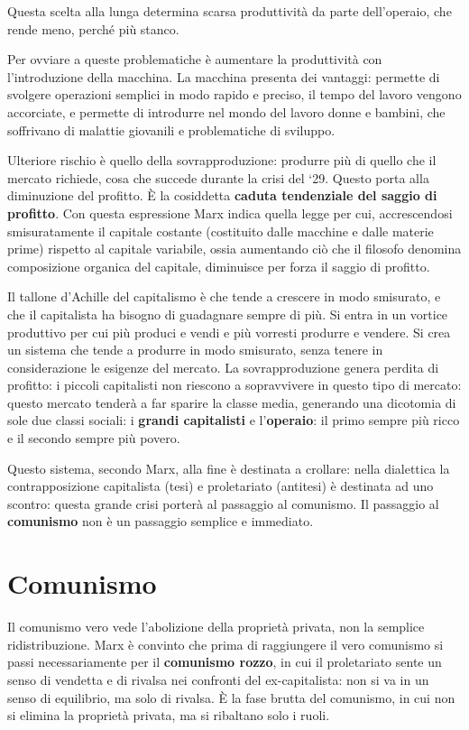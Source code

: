 \documentclass[a4paper, twoside, titlepage]{book}
\begin{document}
Questa scelta alla lunga determina scarsa produttività da parte dell’operaio, che rende meno, perché più stanco.

Per ovviare a queste problematiche è aumentare la produttività con l’introduzione della macchina. La macchina presenta dei vantaggi: permette di svolgere operazioni semplici in modo rapido e preciso, il tempo del lavoro vengono accorciate, e permette di introdurre nel mondo del lavoro donne e bambini, che soffrivano di malattie giovanili e problematiche di sviluppo.

Ulteriore rischio è quello della sovrapproduzione: produrre più di quello che il mercato richiede, cosa che succede durante la crisi del ‘29.
Questo porta alla diminuzione del profitto. È la cosiddetta \textbf{caduta tendenziale del saggio di profitto}. Con questa espressione Marx indica quella legge per cui, accrescendosi smisuratamente il capitale costante (costituito dalle macchine e dalle materie prime) rispetto al capitale variabile, ossia aumentando ciò che il filosofo denomina composizione organica del capitale, diminuisce per forza il saggio di profitto.

Il tallone d’Achille del capitalismo è che tende a crescere in modo smisurato, e che il capitalista ha bisogno di guadagnare sempre di più. Si entra in un vortice produttivo per cui più produci e vendi e più vorresti produrre e vendere. Si crea un sistema che tende a produrre in modo smisurato, senza tenere in considerazione le esigenze del mercato.
La sovrapproduzione genera perdita di profitto: i piccoli capitalisti non riescono a sopravvivere in questo tipo di mercato: questo mercato tenderà a far sparire la classe media, generando una dicotomia di sole due classi sociali: i \textbf{grandi capitalisti} e l’\textbf{operaio}: il primo sempre più ricco e il secondo sempre più povero.

Questo sistema, secondo Marx, alla fine è destinata a crollare: nella dialettica la contrapposizione capitalista (tesi) e proletariato (antitesi) è destinata ad uno scontro: questa grande crisi porterà al passaggio al comunismo.
Il passaggio al \textbf{comunismo} non è un passaggio semplice e immediato.

\section{Comunismo}

Il comunismo vero vede l’abolizione della proprietà privata, non la semplice ridistribuzione. Marx è convinto che prima di raggiungere il vero comunismo si passi necessariamente per il \textbf{comunismo rozzo}, in cui il proletariato sente un senso di vendetta e di rivalsa nei confronti del ex-capitalista: non si va in un senso di equilibrio, ma solo di rivalsa.
È la fase brutta del comunismo, in cui non si elimina la proprietà privata, ma si ribaltano solo i ruoli.
\end{document}
